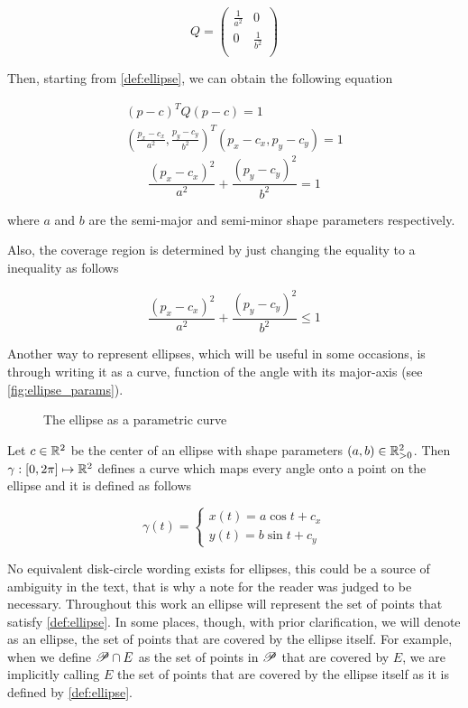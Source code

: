 \[
Q=
\left( {\begin{array}{cc}
    \frac{1}{a^2} & 0 \\
    0 & \frac{1}{b^2} \\
    \end{array} } \right)
\]

Then, starting from \autoref{def:ellipse}, we can obtain the following equation

\begin{align*}
        (p-c)^{T}Q(p-c) = 1\\
    (\frac{p_x-c_x}{a^2}, \frac{p_y-c_y}{b^2})^{T}(p_x-c_x, p_y-c_y) = 1
 \end{align*}
 \begin{equation}\label{equation:pellipse}
  \frac{(p_x-c_x)^2}{a^2} + \frac{(p_y-c_y)^2}{b^2} = 1
 \end{equation}

where $a$ and $b$ are the semi-major and semi-minor shape parameters respectively.

Also, the coverage region is determined by just changing the equality to a inequality as follows

\begin{equation}\label{equation:cover_pellipse}
\frac{(p_x-c_x)^2}{a^2} + \frac{(p_y-c_y)^2}{b^2} \le 1
\end{equation}

Another way to represent ellipses, which will be useful in some occasions, is through writing it as a curve, function of the angle with its major-axis (see \autoref{fig:ellipse_params}).

\begin{figure}[H]
    \centering
    
    \caption{The ellipse as a parametric curve}
    
    \fautor
    \label{fig:ellipse_params}
\end{figure}

Let $c \in \mathbb{R}^2$ be the center of an ellipse with shape parameters $(a,b) \in \mathbb{R}^2_{>0}$. Then $\gamma : [0, 2\pi] \mapsto \mathbb{R}^2$ defines a curve which maps every angle onto a point on the ellipse and it is defined as follows

    \begin{equation}\label{eq:parametric_ellipse}
    \gamma(t) = \left\{
    \begin{array}{l}
    x(t)= a\cos{t} + c_x\\
    y(t)=b\sin{t} + c_y
    \end{array}
    \right.
    \end{equation}

No equivalent disk-circle wording exists for ellipses, this could be a source of ambiguity in the text, that is why a note for the reader was judged to be necessary. Throughout this work an ellipse will represent the set of points that satisfy \autoref{def:ellipse}. In some places, though, with prior clarification, we will denote as an ellipse, the set of points that are covered by the ellipse itself. For example, when we define $\mathscr{P} \cap E$ as the set of points in $\mathscr{P}$ that are covered by $E$, we are implicitly calling $E$ the set of points that are covered by the ellipse itself as it is defined by \autoref{def:ellipse}.